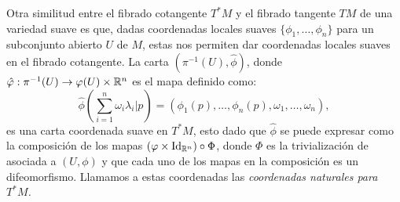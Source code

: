 Otra similitud entre el fibrado cotangente $T^{*}M$ y el fibrado tangente $TM$ de una variedad suave es que, dadas coordenadas locales suaves $\{\phi_1,\ldots,\phi_n\}$ para un subconjunto abierto $U$ de $M$, estas nos permiten dar coordenadas locales suaves en el fibrado cotangente. La carta $(\pi^{-1}(U), \hat{\phi})$, donde $\hat{\varphi}: \pi^{-1}(U) \to \varphi(U) \times \mathbb{R}^n$ es el mapa definido como:
\[
  \hat{\phi} \left(\sum_{i=1}^{n} \omega_i \lambda_i |p \right) 
  = \left(\phi_1(p), \ldots, \phi_n(p), \omega_1, \ldots, \omega_n \right),
\]
es una carta coordenada suave en $T^{*}M$, esto dado que $\hat{\phi}$ se puede expresar como la composición de los mapas $(\varphi \times \mathrm{Id}_{\mathbb{R}^n}) \circ \Phi$, donde $\Phi$ es la trivialización de asociada a $(U,\phi)$ y que cada uno de los mapas en la composición es un difeomorfismo. Llamamos a estas coordenadas las \it{coordenadas naturales para $T^{*}M$}.
